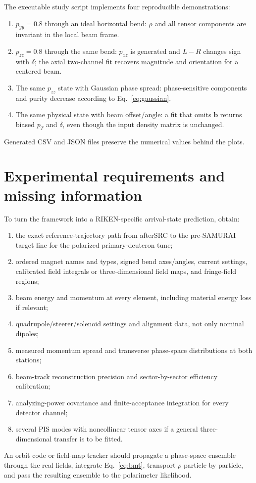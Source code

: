 \documentclass[11pt,a4paper]{article}
\newcommand{\pt}{p_T}
\begin{document}
The executable study script implements four reproducible demonstrations:
\begin{enumerate}
 \item $p_{yy}=0.8$ through an ideal horizontal bend: $\rho$ and all tensor components are invariant in the local beam frame.
 \item $p_{zz}=0.8$ through the same bend: $p_{xz}$ is generated and $L-R$ changes sign with $\delta$; the axial two-channel fit recovers magnitude and orientation for a centered beam.
 \item The same $p_{zz}$ state with Gaussian phase spread: phase-sensitive components and purity decrease according to Eq.~\eqref{eq:gaussian}.
 \item The same physical state with beam offset/angle: a fit that omits $\bm b$ returns biased $\pt$ and $\delta$, even though the input density matrix is unchanged.
\end{enumerate}
Generated CSV and JSON files preserve the numerical values behind the plots.

\section{Experimental requirements and missing information}\label{sec:requirements}

To turn the framework into a RIKEN-specific arrival-state prediction, obtain:
\begin{enumerate}
 \item the exact reference-trajectory path from afterSRC to the pre-SAMURAI target line for the polarized primary-deuteron tune;
 \item ordered magnet names and types, signed bend axes/angles, current settings, calibrated field integrals or three-dimensional field maps, and fringe-field regions;
 \item beam energy and momentum at every element, including material energy loss if relevant;
 \item quadrupole/steerer/solenoid settings and alignment data, not only nominal dipoles;
 \item measured momentum spread and transverse phase-space distributions at both stations;
 \item beam-track reconstruction precision and sector-by-sector efficiency calibration;
 \item analyzing-power covariance and finite-acceptance integration for every detector channel;
 \item several PIS modes with noncollinear tensor axes if a general three-dimensional transfer is to be fitted.
\end{enumerate}
An orbit code or field-map tracker should propagate a phase-space ensemble through the real fields, integrate Eq.~\eqref{eq:bmt}, transport $\rho$ particle by particle, and pass the resulting ensemble to the polarimeter likelihood.
\end{document}
